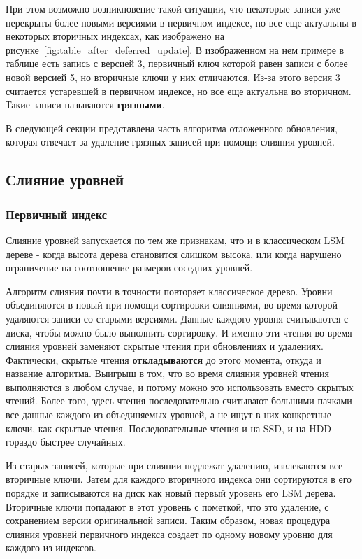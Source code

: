 \documentclass[a4paper,hidelinks,12pt]{article}
\begin{document}
При этом возможно возникновение такой ситуации, что некоторые записи уже
перекрыты более новыми версиями в первичном индексе, но все еще актуальны в
некоторых вторичных индексах, как изображено на
рисунке~\ref{fig:table_after_deferred_update}. В изображенном на нем примере
в таблице есть запись с версией 3, первичный ключ которой равен записи с более
новой версией 5, но вторичные ключи у них отличаются. Из-за этого версия 3
считается устаревшей в первичном индексе, но все еще актуальна во вторичном.
Такие записи называются \textbf {грязными}.

В следующей секции представлена часть алгоритма отложенного обновления, которая
отвечает за удаление грязных записей при помощи слияния уровней.

\subsection{Слияние уровней}
\subsubsection{Первичный индекс}
Слияние уровней запускается по тем же признакам, что и в классическом LSM
дереве - когда высота дерева становится слишком высока, или когда нарушено
ограничение на соотношение размеров соседних уровней.

Алгоритм слияния почти в точности повторяет классическое дерево. Уровни
объединяются в новый при помощи сортировки слияниями, во время которой удаляются
записи со старыми версиями. Данные каждого уровня считываются с диска, чтобы
можно было выполнить сортировку. И именно эти чтения во время слияния уровней
заменяют скрытые чтения при обновлениях и удалениях. Фактически, скрытые чтения
\textbf {откладываются} до этого момента, откуда и название алгоритма. Выигрыш в
том, что во время слияния уровней чтения выполняются в любом случае, и потому
можно это использовать вместо скрытых чтений. Более того, здесь чтения
последовательно считывают большими пачками все данные каждого из объединяемых
уровней, а не ищут в них конкретные ключи, как скрытые чтения. Последовательные
чтения и на SSD, и на HDD гораздо быстрее случайных.

Из старых записей, которые при слиянии подлежат удалению, извлекаются все
вторичные ключи. Затем для каждого вторичного индекса они сортируются в его
порядке и записываются на диск как новый первый уровень его LSM дерева.
Вторичные ключи попадают в этот уровень с пометкой, что это удаление, с
сохранением версии оригинальной записи. Таким образом, новая процедура слияния
уровней первичного индекса создает по одному новому уровню для каждого из
индексов.
\end{document}

